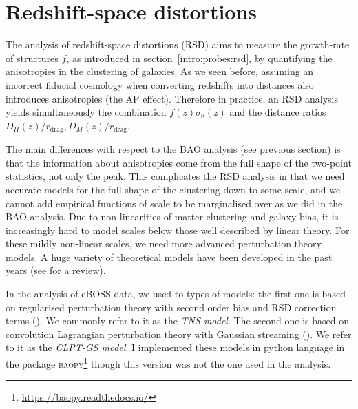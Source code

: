\section{Redshift-space distortions}
\label{galaxies:rsd}

The analysis of redshift-space distortions (RSD) aims to measure the growth-rate of structures $f$, 
as introduced in section~\ref{intro:probes:rsd}, by quantifying the anisotropies in the clustering 
of galaxies. As we seen before, assuming an incorrect fiducial cosmology when converting redshifts 
into distances also introduces anisotropies (the AP effect). Therefore in practice, an RSD analysis
yields simultaneously the combination $f(z)\sigma_8(z)$ and 
the distance ratios $D_H(z)/r_\text{drag}, D_M(z)/r_\text{drag}$. 

The main differences with respect to the BAO analysis (see previous section) is that the information 
about anisotropies come from the full shape of the two-point statistics, not only the peak. 
This complicates the RSD analysis in that we need accurate models for the full shape of 
the clustering down to some scale, and we cannot add empirical functions of scale to be marginalised 
over as we did in the BAO analysis. 
Due to non-linearities of matter clustering and galaxy bias, it is increasingly hard to model scales below 
those well described by linear theory. For these mildly non-linear scales, we need more advanced perturbation theory models. 
A huge variety of theoretical models have been developed in the past years 
(see \cite{bernardeauLargeScaleStructureUniverse2002} for a review). 

In the analysis of eBOSS data, we used to types of models: 
the first one is based on regularised perturbation theory with second order bias and RSD correction terms
(\cite{taruyaBaryonAcousticOscillations2010, taruyaDirectFastCalculation2012}). We commonly refer to it as 
the \emph{TNS model}. The second one is based on convolution Lagrangian perturbation theory with Gaussian streaming
(\cite{carlsonConvolutionLagrangianPerturbation2013, wangAnalyticModelRedshiftspace2014}). 
We refer to it as the \emph{CLPT-GS model}. 
I implemented these models in python language in the package 
\textsc{baopy}\footnote{\url{https://baopy.readthedocs.io/}}
though this version was not the one used in the analysis.  

